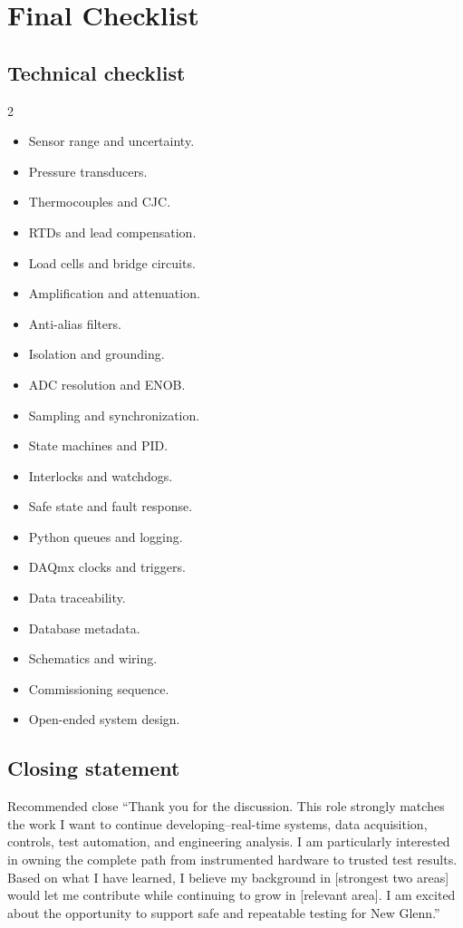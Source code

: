 \documentclass[11pt]{article}
\begin{document}
\section{Final Checklist}

\subsection{Technical checklist}
\begin{multicols}{2}
\begin{itemize}
  \item Sensor range and uncertainty.
  \item Pressure transducers.
  \item Thermocouples and CJC.
  \item RTDs and lead compensation.
  \item Load cells and bridge circuits.
  \item Amplification and attenuation.
  \item Anti-alias filters.
  \item Isolation and grounding.
  \item ADC resolution and ENOB.
  \item Sampling and synchronization.
  \item State machines and PID.
  \item Interlocks and watchdogs.
  \item Safe state and fault response.
  \item Python queues and logging.
  \item DAQmx clocks and triggers.
  \item Data traceability.
  \item Database metadata.
  \item Schematics and wiring.
  \item Commissioning sequence.
  \item Open-ended system design.
\end{itemize}
\end{multicols}

\subsection{Closing statement}
\begin{answerbox}{Recommended close}
``Thank you for the discussion. This role strongly matches the work I want to
continue developing--real-time systems, data acquisition, controls, test
automation, and engineering analysis. I am particularly interested in owning the
complete path from instrumented hardware to trusted test results. Based on what
I have learned, I believe my background in [strongest two areas] would let me
contribute while continuing to grow in [relevant area]. I am excited about the
opportunity to support safe and repeatable testing for New Glenn.''
\end{answerbox}
\end{document}
